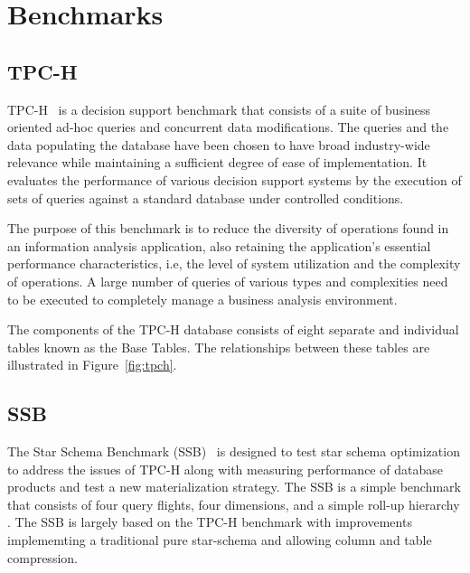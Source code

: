 \section{Benchmarks}
\label{sec:bench}

\subsection{TPC-H}

TPC-H~\cite{ref:tpch} is a decision support benchmark that consists of a suite of business oriented ad-hoc queries and concurrent data modifications. The queries and the data populating the database have been chosen to have broad industry-wide relevance while maintaining a sufficient degree of ease of implementation. It  evaluates the performance of various decision support systems by the execution of sets of queries against a standard database under controlled conditions.

The purpose of this benchmark is to reduce the diversity of operations found in an information analysis application, also retaining the application's essential performance characteristics, i.e, the level of system utilization and the complexity  of  operations.  A  large  number  of  queries  of  various  types  and  complexities  need  to  be  executed  to completely  manage  a  business  analysis  environment.

The  components  of  the  TPC-H  database  consists  of  eight  separate  and  individual  tables known as the Base Tables. The relationships between these tables are illustrated in Figure~\ref{fig:tpch}.




\subsection{SSB}

The Star Schema Benchmark (SSB)~\cite{ref:paper1} is designed to test star schema optimization to address the issues of TPC-H along with measuring performance of database  products  and test  a  new  materialization  strategy. The  SSB  is  a  simple  benchmark  that  consists  of  four  query flights,  four  dimensions,  and  a  simple  roll-up  hierarchy . The SSB is largely based on the TPC-H benchmark with improvements  implememting  a  traditional  pure  star-schema and allowing column and table compression.

